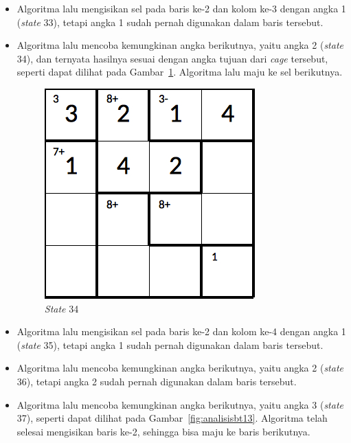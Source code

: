 \documentclass[a4paper,twoside]{article}
\begin{document}
\begin{enumerate}
\begin{itemize}
\item Algoritma lalu mengisikan sel pada baris ke-2 dan kolom ke-3 dengan angka 1 (\textit{state} 33), tetapi angka 1 sudah pernah digunakan dalam baris tersebut.
\item Algoritma lalu mencoba kemungkinan angka berikutnya, yaitu angka 2 (\textit{state} 34), dan ternyata hasilnya sesuai dengan angka tujuan dari \textit{cage} tersebut, seperti dapat dilihat pada Gambar~\ref{fig:analisisbt12}. Algoritma lalu maju ke sel berikutnya.

\begin{figure}
\centering
\captionsetup{justification=centering}
\includegraphics[scale=0.333]{Gambar/backtracking/State34}
\caption[\textit{State} 34]{\textit{State} 34}
\label{fig:analisisbt12}
\end{figure}

\item Algoritma lalu mengisikan sel pada baris ke-2 dan kolom ke-4 dengan angka 1 (\textit{state} 35), tetapi angka 1 sudah pernah digunakan dalam baris tersebut.
\item Algoritma lalu mencoba kemungkinan angka berikutnya, yaitu angka 2 (\textit{state} 36), tetapi angka 2 sudah pernah digunakan dalam baris tersebut.
\item Algoritma lalu mencoba kemungkinan angka berikutnya, yaitu angka 3 (\textit{state} 37), seperti dapat dilihat pada Gambar~\ref{fig:analisisbt13}. Algoritma telah selesai mengisikan baris ke-2, sehingga bisa maju ke baris berikutnya.


\end{itemize}
\end{enumerate}
\end{document}
